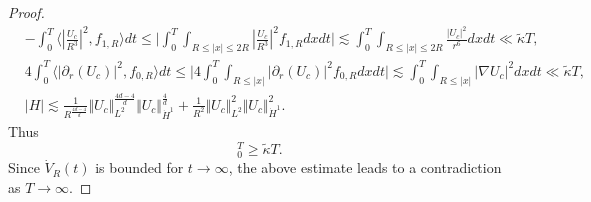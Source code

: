 \documentclass[reqno, 11pt]{amsart}
\numberwithin{equation}{section}
\theoremstyle{plain}
\theoremstyle{definition}
\numberwithin{equation}{section}
\numberwithin{theorem}{section}
\numberwithin{equation}{section}
\numberwithin{equation}{section}
\numberwithin{theorem}{section}
\begin{document}
\begin{proof}
\begin{equation*}
\begin{aligned}
		&-\int_{0}^{T} \langle|\frac{U_c}{R^3}|^2,f_{1,R}\rangle dt\leq \bigg|\int_{0}^{T}\int_{R\leq|x|\leq 2R}|\frac{U_c}{R^3}|^2f_{1,R}dxdt\bigg|\lesssim \int_{0}^{T}\int_{R\leq|x|\leq 2R}\frac{|U_c|^2}{r^6}dxdt\ll \widetilde{\kappa}T,\\ &4\int_{0}^{T} \langle|\partial_{r}(U_c)|^2,f_{0,R}\rangle dt\leq\big|4\int_{0}^{T}\int_{R\leq|x|}|\partial_{r}(U_c)|^2 f_{0,R}dxdt\big|\lesssim\int_{0}^{T}\int_{R\leq|x|}|\nabla U_c|^2dxdt\ll \widetilde{\kappa}T,\\&|H|\lesssim \frac{1}{R^{\frac{4d-4}{d}}} \Vert U_c\Vert_{L^2}^{\frac{4d-4}{d}} \Vert U_c\Vert_{\dot H^1}^{\frac{4}{d}} + \frac{1}{R^2} \Vert U_c\Vert_{L^2}^{2} \Vert U_c\Vert_{\dot H^1}^{2}.
		\end{aligned}
		\end{equation*}
		Thus
		\begin{equation*}
		[\dot{V}_R(t)]_0^T\geq \widetilde{\kappa}T.
		\end{equation*}
		Since $\dot{V}_R(t)$ is bounded for $t\to \infty$, the above estimate leads to  a contradiction as $T\rightarrow\infty$.
		

\end{proof}
\end{document}
